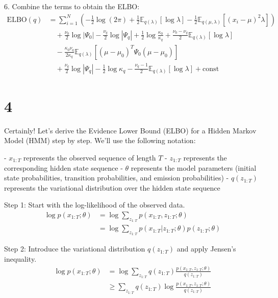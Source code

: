 \documentclass[11pt]{article}
\begin{document}
    6. Combine the terms to obtain the ELBO:
    $$
    \begin{aligned}
        \text{ELBO}(q) &= \sum_{i=1}^N \left(-\frac{1}{2} \log(2\pi) + \frac{1}{2} \mathbb{E}_{q(\lambda)}[\log \lambda] - \frac{1}{2} \mathbb{E}_{q(\mu, \lambda)}[(x_i - \mu)^2 \lambda]\right) \\
        &\quad + \frac{\nu_0}{2} \log |\Psi_0| - \frac{\nu_q}{2} \log |\Psi_q| + \frac{1}{2} \log \frac{\kappa_0}{\kappa_q} + \frac{\nu_0 - \nu_q}{2} \mathbb{E}_{q(\lambda)}[\log \lambda] \\
        &\quad - \frac{\kappa_0 \nu_q}{2\kappa_q} \mathbb{E}_{q(\lambda)}[(\mu - \mu_0)^T \Psi_0 (\mu - \mu_0)] \\
        &\quad + \frac{\nu_q}{2} \log |\Psi_q| - \frac{1}{2} \log \kappa_q - \frac{\nu_q - 1}{2} \mathbb{E}_{q(\lambda)}[\log \lambda] + \text{const}
    \end{aligned}
    $$


    \section{4}
    Certainly! Let's derive the Evidence Lower Bound (ELBO) for a Hidden Markov Model (HMM) step by step. We'll use the following notation:

    - $x_{1:T}$ represents the observed sequence of length $T$
    - $z_{1:T}$ represents the corresponding hidden state sequence
    - $\theta$ represents the model parameters (initial state probabilities, transition probabilities, and emission probabilities)
    - $q(z_{1:T})$ represents the variational distribution over the hidden state sequence

    Step 1: Start with the log-likelihood of the observed data.
    \begin{align*}
        \log p(x_{1:T}; \theta) &= \log \sum_{z_{1:T}} p(x_{1:T}, z_{1:T}; \theta) \\
        &= \log \sum_{z_{1:T}} p(x_{1:T} | z_{1:T}; \theta) p(z_{1:T}; \theta)
    \end{align*}

    Step 2: Introduce the variational distribution $q(z_{1:T})$ and apply Jensen's inequality.
    \begin{align*}
        \log p(x_{1:T}; \theta) &= \log \sum_{z_{1:T}} q(z_{1:T}) \frac{p(x_{1:T}, z_{1:T}; \theta)}{q(z_{1:T})} \\
        &\geq \sum_{z_{1:T}} q(z_{1:T}) \log \frac{p(x_{1:T}, z_{1:T}; \theta)}{q(z_{1:T})}
    \end{align*}
\end{document}

